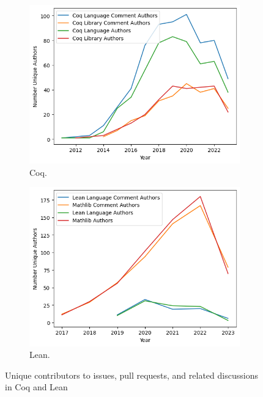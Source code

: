 \documentclass[sigconf,nonacm]{acmart}
\begin{document}
\begin{figure}[H]
\begin{subfigure}{0.8\columnwidth}
  \includegraphics[width=\linewidth]{coq_ispr_authors.png}
  \caption{Coq.}
  \label{fig:1}
\end{subfigure}
\hfill %
\begin{subfigure}{0.8\columnwidth}
  \includegraphics[width=\linewidth]{lean_ispr_authors.png}
  \caption{Lean.}
  \label{fig:2}
\end{subfigure}
\caption{Unique contributors to issues, pull requests, and related discussions in Coq and Lean}
\label{authors}
\end{figure}
\end{document}
